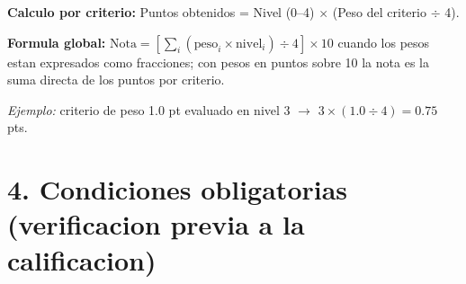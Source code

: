 \documentclass[10pt]{article}
\begin{document}
\medskip

\noindent\textbf{Calculo por criterio:} Puntos obtenidos = Nivel (0--4) $\times$ (Peso del criterio $\div$ 4).

\noindent\textbf{Formula global:} $\mathrm{Nota} = \left[\displaystyle\sum_{i} (\mathrm{peso}_{i} \times \mathrm{nivel}_{i}) \div 4\right] \times 10$ \quad cuando los pesos estan expresados como fracciones; con pesos en puntos sobre 10 la nota es la suma directa de los puntos por criterio.

\textit{Ejemplo:} criterio de peso 1.0 pt evaluado en nivel 3 $\rightarrow$ $3 \times (1.0 \div 4) = 0.75$ pts.

\section{4. Condiciones obligatorias (verificacion previa a la calificacion)}
\end{document}

